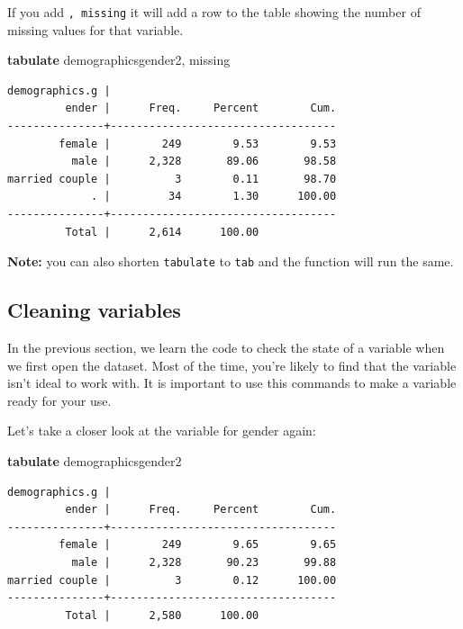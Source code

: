 \documentclass[
]{book}
\newenvironment{Shaded}{\begin{snugshade}}{\end{snugshade}}
\newcommand{\FunctionTok}[1]{\textcolor[rgb]{0.00,0.00,0.00}{#1}}
\newcommand{\KeywordTok}[1]{\textcolor[rgb]{0.13,0.29,0.53}{\textbf{#1}}}
\newcommand{\NormalTok}[1]{#1}
\begin{document}
If you add \texttt{,\ missing} it will add a row to the table showing the number of missing values for that variable.

\begin{Shaded}
\begin{Highlighting}[]
\KeywordTok{tabulate}\NormalTok{ demographicsgender2, }\FunctionTok{missing}
\end{Highlighting}
\end{Shaded}

\begin{verbatim}
demographics.g |
         ender |      Freq.     Percent        Cum.
---------------+-----------------------------------
        female |        249        9.53        9.53
          male |      2,328       89.06       98.58
married couple |          3        0.11       98.70
             . |         34        1.30      100.00
---------------+-----------------------------------
         Total |      2,614      100.00
\end{verbatim}

\textbf{Note:} you can also shorten \texttt{tabulate} to \texttt{tab} and the function will run the same.

\hypertarget{recode}{%
\subsection*{Cleaning variables}\label{recode}}

In the previous section, we learn the code to check the state of a variable when we first open the dataset. Most of the time, you're likely to find that the variable isn't ideal to work with. It is important to use this commands to make a variable ready for your use.

Let's take a closer look at the variable for gender again:

\begin{Shaded}
\begin{Highlighting}[]
\KeywordTok{tabulate}\NormalTok{ demographicsgender2}
\end{Highlighting}
\end{Shaded}

\begin{verbatim}
demographics.g |
         ender |      Freq.     Percent        Cum.
---------------+-----------------------------------
        female |        249        9.65        9.65
          male |      2,328       90.23       99.88
married couple |          3        0.12      100.00
---------------+-----------------------------------
         Total |      2,580      100.00
\end{verbatim}
\end{document}
